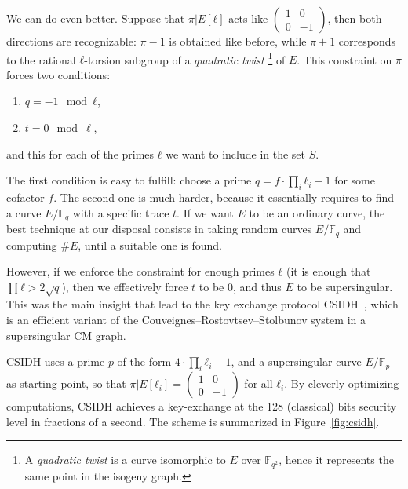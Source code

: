 \documentclass[10pt]{article}
\theoremstyle{plain}
\theoremstyle{definition}
\def\F{\ensuremath{\mathbb{F}}}
\def\mat#1{\left(\begin{smallmatrix}#1\end{smallmatrix}\right)}
\begin{document}
\begin{prposition}
We can do even better. %
Suppose that $π|E[ℓ]$ acts like $\mat{1&0\\0&-1}$, then both
directions are recognizable: $π-1$ is obtained like before, while
$π+1$ corresponds to the rational $ℓ$-torsion subgroup of a
\emph{quadratic twist}%
\footnote{A \emph{quadratic twist} is a curve isomorphic to $E$ over
  $\F_{q^2}$, hence it represents the same point in the isogeny
  graph.} %
of $E$. %
This constraint on $π$ forces two conditions:
\begin{enumerate}
\item $q=-1 \mod ℓ$,
\item $t = 0 \mod\ell$,
\end{enumerate}
and this for each of the primes $ℓ$ we want to include in the set $S$.

The first condition is easy to fulfill: choose a prime
$q=f·\prod_i ℓ_i - 1$ for some cofactor $f$. %
The second one is much harder, because it essentially requires to find
a curve $E/\F_q$ with a specific trace $t$. %
If we want $E$ to be an ordinary curve, the best technique at our
disposal consists in taking random curves $E/\F_q$ and computing
$\#E$, until a suitable one is found. %

However, if we enforce the constraint for enough primes $ℓ$ (it is
enough that $\prod ℓ>2\sqrt{q}$), then we effectively force $t$ to be
$0$, and thus $E$ to be supersingular. %
This was the main insight that lead to the key exchange protocol
CSIDH~\cite{AC:CLMPR18}, which is an efficient variant of the
Couveignes--Rostovtsev--Stolbunov system in a supersingular CM
graph. %

CSIDH uses a prime $p$ of the form $4·\prod_iℓ_i-1$, and a
supersingular curve $E/\F_p$ as starting point, so that
$π|E[ℓ_i]=\mat{1&0\\0&-1}$ for all $ℓ_i$. %
By cleverly optimizing computations, CSIDH achieves a key-exchange at
the 128 (classical) bits security level in fractions of a second. %
The scheme is summarized in Figure~\ref{fig:csidh}.


\end{prposition}
\end{document}
